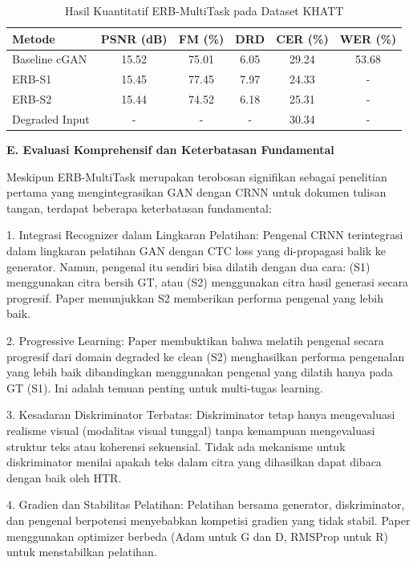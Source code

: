 \documentclass[12pt,a4paper]{article}
\begin{document}
\begin{table}[H]
\centering
\caption{Hasil Kuantitatif ERB-MultiTask pada Dataset KHATT}
\label{tab:erb-results}
\begin{tabular}{|l|c|c|c|c|c|}
\hline
\textbf{Metode} & \textbf{PSNR (dB)} & \textbf{FM (\%)} & \textbf{DRD} & \textbf{CER (\%)} & \textbf{WER (\%)} \\
\hline
Baseline cGAN & 15.52 & 75.01 & 6.05 & 29.24 & 53.68 \\
ERB-S1 & 15.45 & 77.45 & 7.97 & 24.33 & - \\
ERB-S2 & 15.44 & 74.52 & 6.18 & 25.31 & - \\
Degraded Input & - & - & - & 30.34 & - \\
\hline
\end{tabular}
\end{table}

\noindent\textbf{E. Evaluasi Komprehensif dan Keterbatasan Fundamental}

Meskipun ERB-MultiTask merupakan terobosan signifikan sebagai penelitian pertama yang mengintegrasikan GAN dengan CRNN untuk dokumen tulisan tangan, terdapat beberapa keterbatasan fundamental:

1. Integrasi Recognizer dalam Lingkaran Pelatihan:
Pengenal CRNN terintegrasi dalam lingkaran pelatihan GAN dengan CTC loss yang di-propagasi balik ke generator. Namun, pengenal itu sendiri bisa dilatih dengan dua cara: (S1) menggunakan citra bersih GT, atau (S2) menggunakan citra hasil generasi secara progresif. Paper menunjukkan S2 memberikan performa pengenal yang lebih baik.

2. Progressive Learning:
Paper membuktikan bahwa melatih pengenal secara progresif dari domain degraded ke clean (S2) menghasilkan performa pengenalan yang lebih baik dibandingkan menggunakan pengenal yang dilatih hanya pada GT (S1). Ini adalah temuan penting untuk multi-tugas learning.

3. Kesadaran Diskriminator Terbatas:
Diskriminator tetap hanya mengevaluasi realisme visual (modalitas visual tunggal) tanpa kemampuan mengevaluasi struktur teks atau koherensi sekuensial. Tidak ada mekanisme untuk diskriminator menilai apakah teks dalam citra yang dihasilkan dapat dibaca dengan baik oleh HTR.

4. Gradien dan Stabilitas Pelatihan:
Pelatihan bersama generator, diskriminator, dan pengenal berpotensi menyebabkan kompetisi gradien yang tidak stabil. Paper menggunakan optimizer berbeda (Adam untuk G dan D, RMSProp untuk R) untuk menstabilkan pelatihan.
\end{document}
